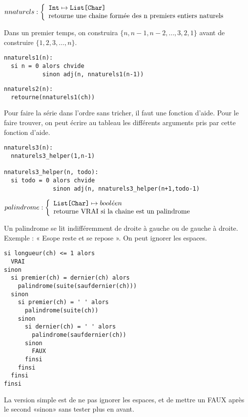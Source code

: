 \documentclass[10pt]{article}\usepackage[correction,nu]{esial}
\begin{document}
\begin{Question}
  $nnaturels: \left\{
    \begin{array}{l}
      \text{\texttt{Int}}\mapsto \text{\texttt{List[Char]}}\\
      \text{retourne une chaine formée des n premiers entiers naturels}
    \end{array}\right.$  
  
  Dans un premier temps, on construira $\{n, n-1, n-2, \ldots, 3, 2, 1\}$ avant
  de construire $\{1, 2, 3, \ldots, n\}$.
\end{Question}
\begin{Reponse}
  \begin{Verbatim}[label=Version simple qui donne la liste à l'envers]
nnaturels1(n):
  si n = 0 alors chvide
           sinon adj(n, nnaturels1(n-1))
  \end{Verbatim}

  \begin{Verbatim}[label=Version trichée qui donne la chaine à l'endroit:]
nnaturels2(n):
  retourne(nnaturels1(ch))
  \end{Verbatim}
  
  Pour faire la série dans l'ordre sans tricher, il faut une fonction
  d'aide. Pour le faire trouver, on peut écrire au tableau les différents
  arguments pris par cette fonction d'aide.
  \begin{Verbatim}[label=Version avec helper:]
nnaturels3(n):
  nnaturels3_helper(1,n-1)    

nnaturels3_helper(n, todo):
  si todo = 0 alors chvide
              sinon adj(n, nnaturels3_helper(n+1,todo-1)
  \end{Verbatim}
\end{Reponse}


\begin{Question}
  $palindrome: \left\{
    \begin{array}{l}
      \text{\texttt{List[Char]}}\mapsto bool\acute{e}en\\
      \text{retourne VRAI si la chaine est un palindrome}
    \end{array}\right.$  

  Un palindrome se lit indifféremment de droite à gauche ou de gauche à droite.
  Exemple : « Esope reste et se repose ». On peut ignorer les espaces.
\end{Question}
\begin{Reponse}
  \begin{Verbatim}[label=palindrome(ch)]
si longueur(ch) <= 1 alors 
  VRAI
sinon
  si premier(ch) = dernier(ch) alors
    palindrome(suite(saufdernier(ch)))
  sinon 
    si premier(ch) = ' ' alors
      palindrome(suite(ch))
    sinon 
      si dernier(ch) = ' ' alors
        palindrome(saufdernier(ch))
      sinon
        FAUX
      finsi
    finsi    
  finsi
finsi    
  \end{Verbatim}
  La version simple est de ne pas ignorer les espaces, et de
  mettre un FAUX après le second «sinon» sans tester plus en avant.
\end{Reponse}
\end{document}
